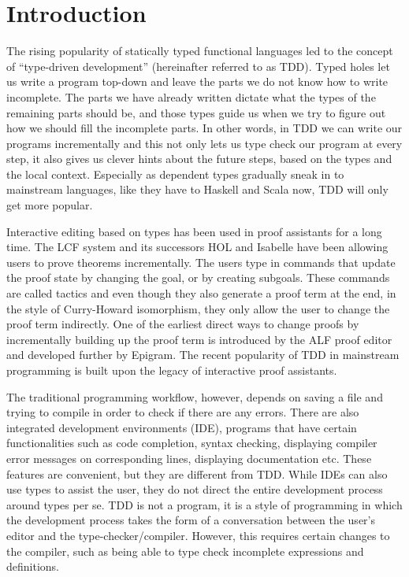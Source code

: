 \section{Introduction} \label{sec:introduction}

The rising popularity of statically typed functional languages led to
the concept of ``type-driven development'' (hereinafter referred to as TDD).
Typed holes let us write a program top-down and leave the parts we do not know
how to write incomplete. The parts we have already written dictate what the
types of the remaining parts should be, and those types guide us when we try to
figure out how we should fill the incomplete parts.
In other words, in TDD we can write our programs incrementally and this not only
lets us type check our program at every step, it also gives us clever
hints about the future steps, based on the types and the local context.
Especially as dependent types gradually sneak in to mainstream languages, like they have to
Haskell\cite{eisenberg} and Scala\cite{scalaDep} now, TDD will only get more popular.

Interactive editing based on types has been used in proof assistants for a long
time. The LCF system\cite{lcf} and its successors HOL and
Isabelle\cite{isabelle} have been allowing users to prove theorems
incrementally. The users type in commands that update the proof state by
changing the goal, or by creating subgoals. These commands are called
tactics and even though they also generate a proof term at the end, in the style
of Curry-Howard isomorphism, they only allow the user to change the proof
term indirectly. One of the earliest direct ways to change proofs by
incrementally building up the proof term is introduced by the ALF proof
editor\cite{ALF} and developed further by Epigram.\cite{epigram} The recent
popularity of TDD in mainstream programming is built upon the legacy of
interactive proof assistants.

The traditional programming workflow, however, depends on saving a
file and trying to compile in order to check if there are any
errors. There are also integrated development environments (IDE),
programs that have certain functionalities such as code completion, syntax
checking, displaying compiler error messages on corresponding lines, displaying
documentation etc. These features are convenient, but they are different from
TDD. While IDEs can also use types to assist the user, they do not direct the
entire development process around types per se. TDD is not a program, it is a
style of programming in which the development process takes the form of a
conversation between the user's editor and the type-checker/compiler. However,
this requires certain changes to the compiler, such as being able to type check
incomplete expressions and definitions.\cite{tdd}

